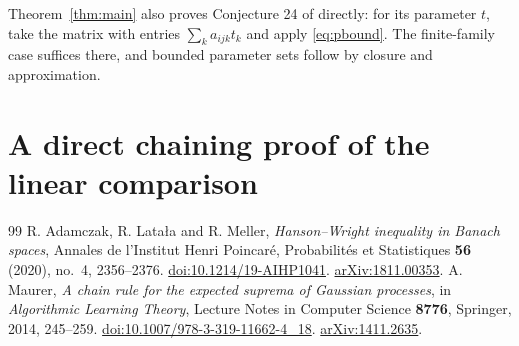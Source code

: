 \documentclass[10pt,a4paper]{amsart}
\numberwithin{equation}{section}
\begin{document}
Theorem~\ref{thm:main} also proves Conjecture 24 of \cite{ALM} directly: for its parameter $t$, take the matrix with entries $\sum_k a_{ijk}t_k$ and apply \eqref{eq:pbound}. The finite-family case suffices there, and bounded parameter sets follow by closure and approximation.

\clearpage
\appendix
\section{A direct chaining proof of the linear comparison}\label{app:chain}


\begin{thebibliography}{99}
 R. Adamczak, R. Lata{\l}a and R. Meller, \emph{Hanson--Wright inequality in Banach spaces}, Annales de l'Institut Henri Poincar\'e, Probabilit\'es et Statistiques \textbf{56} (2020), no.~4, 2356--2376. \href{https://doi.org/10.1214/19-AIHP1041}{doi:10.1214/19-AIHP1041}. \href{https://arxiv.org/abs/1811.00353}{arXiv:1811.00353}.
 A. Maurer, \emph{A chain rule for the expected suprema of Gaussian processes}, in \emph{Algorithmic Learning Theory}, Lecture Notes in Computer Science \textbf{8776}, Springer, 2014, 245--259. \href{https://doi.org/10.1007/978-3-319-11662-4_18}{doi:10.1007/978-3-319-11662-4\_18}. \href{https://arxiv.org/abs/1411.2635}{arXiv:1411.2635}.
\end{thebibliography}
\end{document}

